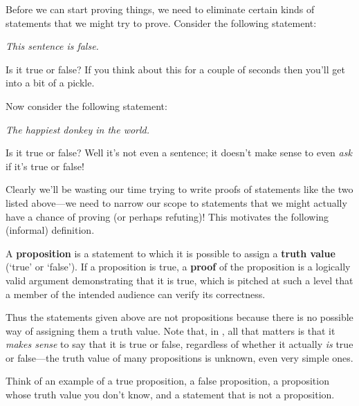 
Before we can start proving things, we need to eliminate certain kinds of statements that we might try to prove. Consider the following statement:
\begin{center} \textit{This sentence is false.} \end{center}
Is it true or false? If you think about this for a couple of seconds then you'll get into a bit of a pickle.

Now consider the following statement:
\begin{center} \textit{The happiest donkey in the world.} \end{center}
Is it true or false? Well it's not even a sentence; it doesn't make sense to even \textit{ask} if it's true or false!

Clearly we'll be wasting our time trying to write proofs of statements like the two listed above---we need to narrow our scope to statements that we might actually have a chance of proving (or perhaps refuting)! This motivates the following (informal) definition.

\begin{definition}
\label{defProposition}
\label{defProof}
A \textbf{proposition}  is a statement to which it is possible to assign a \textbf{truth value} (`true' or `false'). If a proposition is true, a \textbf{proof} of the proposition is a logically valid argument demonstrating that it is true, which is pitched at such a level that a member of the intended audience can verify its correctness.
\end{definition}

Thus the statements given above are not propositions because there is no possible way of assigning them a truth value. Note that, in , all that matters is that it \textit{makes sense} to say that it is true or false, regardless of whether it actually \textit{is} true or false---the truth value of many propositions is unknown, even very simple ones.

\begin{exercise}
Think of an example of a true proposition, a false proposition, a proposition whose truth value you don't know, and a statement that is not a proposition.
\end{exercise}

